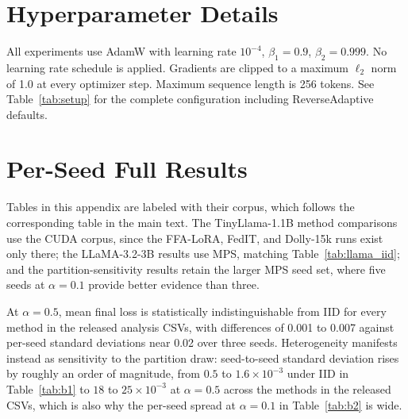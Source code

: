 \section{Hyperparameter Details}
\label{app:hyper}
All experiments use AdamW \cite{loshchilov2019decoupled} with learning rate $10^{-4}$, $\beta_1{=}0.9$, $\beta_2{=}0.999$. No learning rate schedule is applied. Gradients are clipped to a maximum $\ell_2$ norm of 1.0 at every optimizer step. Maximum sequence length is 256 tokens. See Table~\ref{tab:setup} for the complete configuration including ReverseAdaptive defaults.

\section{Per-Seed Full Results}
\label{app:perseed}
Tables in this appendix are labeled with their corpus, which follows the corresponding table in the main text. The TinyLlama-1.1B method comparisons use the CUDA corpus, since the FFA-LoRA, FedIT, and Dolly-15k runs exist only there; the LLaMA-3.2-3B results use MPS, matching Table~\ref{tab:llama_iid}; and the partition-sensitivity results retain the larger MPS seed set, where five seeds at $\alpha{=}0.1$ provide better evidence than three.

At $\alpha{=}0.5$, mean final loss is statistically indistinguishable from IID for every method in the released analysis CSVs, with differences of 0.001 to 0.007 against per-seed standard deviations near 0.02 over three seeds. Heterogeneity manifests instead as sensitivity to the partition draw: seed-to-seed standard deviation rises by roughly an order of magnitude, from $0.5$ to $1.6 \times 10^{-3}$ under IID in Table~\ref{tab:b1} to $18$ to $25 \times 10^{-3}$ at $\alpha{=}0.5$ across the methods in the released CSVs, which is also why the per-seed spread at $\alpha{=}0.1$ in Table~\ref{tab:b2} is wide.

